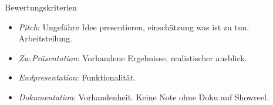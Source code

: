 \begin{frame}{Bewertungskriterien}
\begin{itemize}
\item \emph{Pitch}: Ungefähre Idee presentieren, einschätzung was ist zu tun. Arbeitsteilung.
\item \emph{Zw.Präsentation}: Vorhandene Ergebnisse, realistischer ausblick.
\item \emph{Endpresentation}: Funktionalität.
\item \emph{Dokumentation}: Vorhandenheit. Keine Note ohne Doku auf Showreel.
\end{itemize}




\end{frame}
